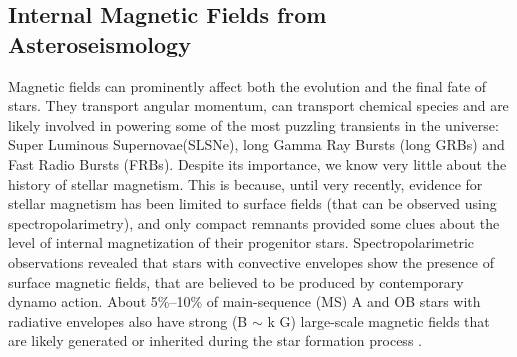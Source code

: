 {\color{red}\subsection{Internal Magnetic Fields from Asteroseismology}}
Magnetic fields can prominently affect both the evolution and the final fate of stars. They transport angular momentum, can transport chemical species
and are likely involved in powering some of the most puzzling transients in the universe: Super Luminous Supernovae(SLSNe), long Gamma Ray Bursts (long GRBs) and Fast Radio Bursts (FRBs). 
Despite its importance, we know very little about the history of stellar magnetism. This is  because, until very recently, 
evidence for stellar magnetism has been limited to surface fields (that can be observed using spectropolarimetry),
and only compact remnants provided some clues about the level of internal magnetization of their progenitor stars.
Spectropolarimetric observations revealed that stars with convective envelopes show the presence of
surface magnetic fields, that are believed to be produced by contemporary dynamo action.
About 5\%–10\% of main-sequence (MS) A and OB stars with radiative envelopes also have strong (B $\sim$ k G)
large-scale magnetic fields that are likely generated or inherited during the star
formation process \citep[fossil fields, see e.g.,][]{2012ASPC..464..405}. 